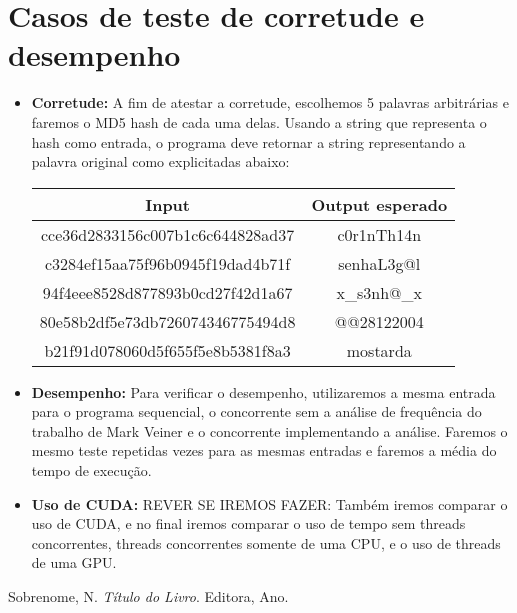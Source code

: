 \documentclass[12pt, a4paper]{article}
\begin{document}
\section{Casos de teste de corretude e desempenho}
\begin{itemize}
    \item \textbf{Corretude:} A fim de atestar a corretude, escolhemos 5 palavras arbitrárias e faremos o MD5 hash de cada uma delas. Usando a string que representa o hash como entrada, o programa deve retornar a string representando a palavra original como explicitadas abaixo:
    \begin{center}
    \begin{tabular}{ |c|c| } 
     \hline
     Input & Output esperado \\
     \hline
     cce36d2833156c007b1c6c644828ad37 & c0r1nTh14n \\
     c3284ef15aa75f96b0945f19dad4b71f & senhaL3g@l \\
     94f4eee8528d877893b0cd27f42d1a67 & x\_s3nh@\_x \\
     80e58b2df5e73db726074346775494d8 & @@28122004 \\
     b21f91d078060d5f655f5e8b5381f8a3 & mostarda  \\
     \hline
    \end{tabular}

    \end{center}

        \item \textbf{Desempenho:} Para verificar o desempenho, utilizaremos a mesma entrada para o programa sequencial, o concorrente sem a análise de frequência do trabalho de Mark Veiner e o concorrente implementando a análise. Faremos o mesmo teste repetidas vezes para as mesmas entradas e faremos a média do tempo de execução.
        \item \textbf{Uso de CUDA:} REVER SE IREMOS FAZER: Também iremos comparar o uso de CUDA, e no final iremos comparar o uso de tempo sem threads concorrentes, threads concorrentes somente de uma CPU, e o uso de threads de uma GPU.
\end{itemize}

\begin{thebibliography}{9}
    Sobrenome, N. \textit{Título do Livro}. Editora, Ano.


\end{thebibliography}
\end{document}
